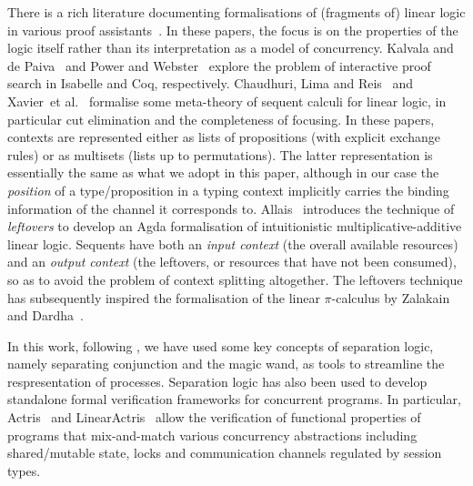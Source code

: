 There is a rich literature documenting formalisations of (fragments of) linear
logic in various proof
assistants~\cite{KalvalaDePaiva95,PowerWebster99,Allais17,ChaudhuriLimaReis17,ChaudhuriLimaReis19,XavierEtAl18}.
In these papers, the focus is on the properties of the logic itself rather than
its interpretation as a model of concurrency. Kalvala and de
Paiva~\cite{KalvalaDePaiva95} and Power and Webster~\cite{PowerWebster99}
explore the problem of interactive proof search in Isabelle and Coq,
respectively. Chaudhuri, Lima and
Reis~\cite{ChaudhuriLimaReis17,ChaudhuriLimaReis19} and Xavier~et
al.~\cite{XavierEtAl18} formalise some meta-theory of sequent calculi for linear
logic, in particular cut elimination and the completeness of focusing. In these
papers, contexts are represented either as lists of propositions (with explicit
exchange rules) or as multisets (lists up to permutations). The latter
representation is essentially the same as what we adopt in this paper, although in our
case the \emph{position} of a type/proposition in a typing context implicitly
carries the binding information of the channel it corresponds to.
%
Allais~\cite{Allais17} introduces the technique of \emph{leftovers} to develop
an Agda formalisation of intuitionistic multiplicative-additive linear logic.
Sequents have both an \emph{input context} (the overall available resources) and
an \emph{output context} (the leftovers, or resources that have not been
consumed), so as to avoid the problem of context splitting altogether. The
leftovers technique has subsequently inspired the formalisation of the linear
$\pi$-calculus by Zalakain and Dardha~\cite{ZalakainDardha21}.

In this work, following \cite{RouvoetPoulsenKrebbersVisser20}, we have used some
key concepts of separation logic, namely separating conjunction and the magic
wand, as tools to streamline the respresentation of processes. Separation logic
has also been used to develop standalone formal verification frameworks for
concurrent programs. In particular, Actris~\cite{HinrichsenBengtsonKrebbers20}
and LinearActris~\cite{JacobsHinrichsenKrebbers24} allow the verification of
functional properties of programs that mix-and-match various concurrency
abstractions including shared/mutable state, locks and communication channels
regulated by session types.